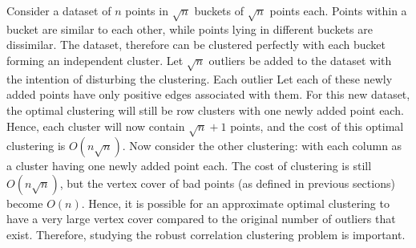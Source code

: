 Consider a dataset of $n$ points in $\sqrt{n}$ buckets of $\sqrt{n}$ points each. Points within a bucket are similar to each other, while points lying in different buckets are dissimilar. The dataset, therefore can be clustered perfectly with each bucket forming an independent cluster. Let $\sqrt{n}$ outliers be added to the dataset with the intention of disturbing the clustering. Each outlier Let each of these newly added points have only positive edges associated with them. For this new dataset, the optimal clustering will still be row clusters with one newly added point each. Hence, each cluster will now contain $\sqrt{n}+1$ points, and the cost of this optimal clustering is $O(n\sqrt{n})$. Now consider the other clustering: with each column as a cluster having one newly added point each. The cost of clustering is still $O(n\sqrt{n})$, but the vertex cover of bad points (as defined in previous sections) become $O(n)$. Hence, it is possible for an approximate optimal clustering to have a very large vertex cover compared to the original number of outliers that exist. Therefore, studying the robust correlation clustering problem is important.

